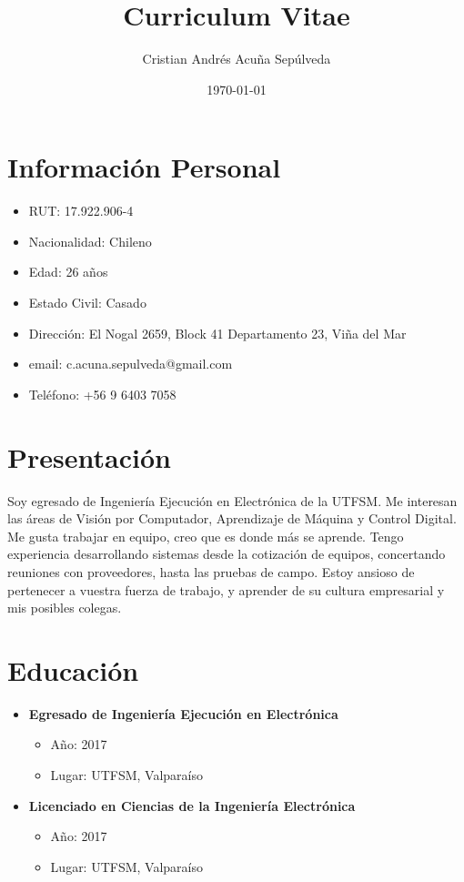 \documentclass[11pt,letterpaper,sans]{moderncv}
\author{Cristian Andrés Acuña Sepúlveda}
\date{\today}
\title{Curriculum Vitae}
\begin{document}
\maketitle
\tableofcontents

\section{Información Personal}
\label{sec:orgfa4e788}
\begin{itemize}
\item RUT: 17.922.906-4
\item Nacionalidad: Chileno
\item Edad: 26 años
\item Estado Civil: Casado
\item Dirección: El Nogal 2659, Block 41 Departamento 23, Viña del Mar
\item email: c.acuna.sepulveda@gmail.com
\item Teléfono: +56 9 6403 7058
\end{itemize}
\section{Presentación}
\label{sec:org93c8601}
  Soy egresado de Ingeniería Ejecución en Electrónica de la UTFSM. Me interesan
las áreas de Visión por Computador, Aprendizaje de Máquina y Control Digital.
Me gusta trabajar en equipo, creo que es donde más se aprende. Tengo experiencia
desarrollando sistemas desde la cotización de equipos, concertando reuniones con
proveedores, hasta las pruebas de campo. Estoy ansioso de pertenecer a vuestra
fuerza de trabajo, y aprender de su cultura empresarial y mis posibles colegas. 
\section{Educación}
\label{sec:org0bb4669}
\begin{itemize}
\item \textbf{Egresado de Ingeniería Ejecución en Electrónica}
\begin{itemize}
\item Año: 2017
\item Lugar: UTFSM, Valparaíso
\end{itemize}
\item \textbf{Licenciado en Ciencias de la Ingeniería Electrónica}
\begin{itemize}
\item Año: 2017
\item Lugar: UTFSM, Valparaíso
\end{itemize}
\end{itemize}
\end{document}
